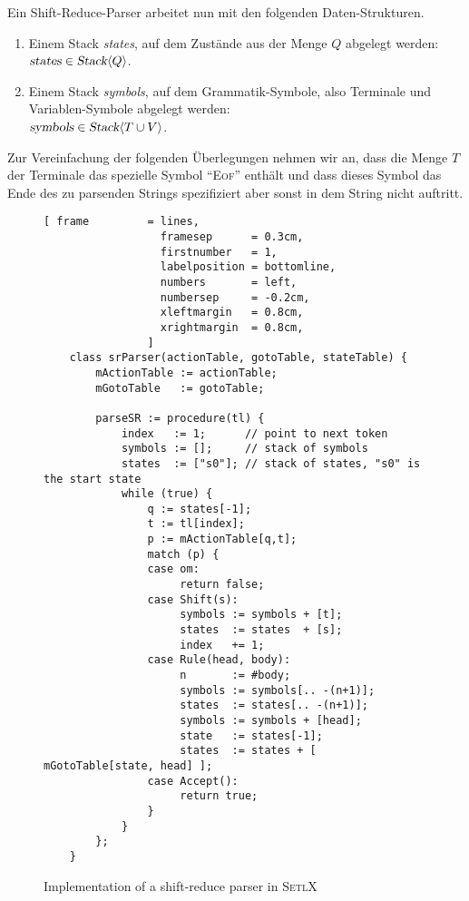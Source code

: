 Ein Shift-Reduce-Parser arbeitet nun mit den folgenden Daten-Strukturen.
\begin{enumerate}
\item Einem Stack \textsl{states}, auf dem Zust\"ande aus der Menge $Q$ abgelegt werden:
      \\[0.2cm]
      \hspace*{1.3cm}
      $\textsl{states} \in \textsl{Stack}\langle Q \rangle$.
\item Einem Stack \textsl{symbols}, auf dem Grammatik-Symbole, also Terminale und Variablen-Symbole
      abgelegt werden: 
      \\[0.2cm]
      \hspace*{1.3cm}
      $\textsl{symbols} \in \textsl{Stack}\langle T \cup V \rangle$.
\end{enumerate}
Zur Vereinfachung der folgenden \"Uberlegungen nehmen wir an, dass die Menge $T$ der Terminale das
spezielle Symbol ``\textsc{Eof}'' enth\"alt und dass dieses Symbol das Ende des zu parsenden
Strings spezifiziert aber sonst in dem String nicht auftritt.  

\begin{figure}[!ht]
\centering
\begin{Verbatim}[ frame         = lines, 
                  framesep      = 0.3cm, 
                  firstnumber   = 1,
                  labelposition = bottomline,
                  numbers       = left,
                  numbersep     = -0.2cm,
                  xleftmargin   = 0.8cm,
                  xrightmargin  = 0.8cm,
                ]
    class srParser(actionTable, gotoTable, stateTable) {
        mActionTable := actionTable;
        mGotoTable   := gotoTable;
    
        parseSR := procedure(tl) {
            index   := 1;      // point to next token
            symbols := [];     // stack of symbols
            states  := ["s0"]; // stack of states, "s0" is the start state
            while (true) {            
                q := states[-1];
                t := tl[index];
                p := mActionTable[q,t];
                match (p) {
                case om: 
                     return false;
                case Shift(s):
                     symbols := symbols + [t];
                     states  := states  + [s];
                     index   += 1;
                case Rule(head, body):
                     n       := #body;
                     symbols := symbols[.. -(n+1)];
                     states  := states[.. -(n+1)]; 
                     symbols := symbols + [head];
                     state   := states[-1];
                     states  := states + [ mGotoTable[state, head] ];
                case Accept():
                     return true;
                } 
            }
        };
    }
\end{Verbatim}
\vspace*{-0.3cm}
\caption{Implementation of a shift-reduce parser in \textsc{SetlX}}
\label{fig:shift-reduce-parser.stlx}
\end{figure}

